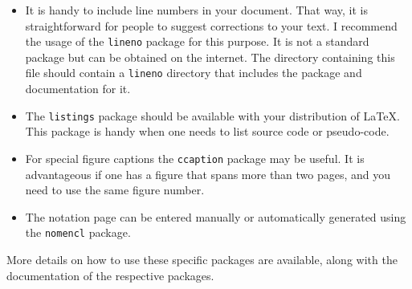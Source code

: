 \begin{itemize}  
	\item It is handy to include line numbers in your document. That way, it is straightforward for people to suggest corrections to your text. I recommend the usage of the \texttt{lineno} package for this purpose. It is not a standard package but can be obtained on the internet. The directory containing this file should contain a \verb|lineno| directory that includes the package and documentation for it.
	
	\item The \texttt{listings} package should be available with your
	distribution of \LaTeX.  This package is handy when one needs to list source code or pseudo-code.
	
	\item For special figure captions the \texttt{ccaption} package may be useful.  It is advantageous if one has a figure that spans more than two pages, and you need to use the same figure number.
	
	\item The notation page can be entered manually or automatically generated using the \texttt{nomencl} package.
	
\end{itemize}

More details on how to use these specific packages are available, along
with the documentation of the respective packages.
